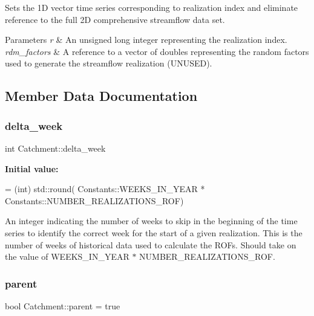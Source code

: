 Sets the 1D vector time series corresponding to realization index and eliminate reference to the full 2D comprehensive streamflow data set. 


\begin{DoxyParams}{Parameters}
{\em r} & An unsigned long integer representing the realization index. \\
\hline
{\em rdm\+\_\+factors} & A reference to a vector of doubles representing the random factors used to generate the streamflow realization (U\+N\+U\+S\+ED). \\
\hline
\end{DoxyParams}


\subsection{Member Data Documentation}
\mbox{\label{classCatchment_a20548a9d03f0d39f297cb15b3c0433ad}} 
\subsubsection{\texorpdfstring{delta\+\_\+week}{delta\_week}}
{\footnotesize\ttfamily int Catchment\+::delta\+\_\+week\hspace{0.3cm}{\ttfamily [protected]}}

{\bfseries Initial value\+:}
\begin{DoxyCode}
= (int) std::round(
            Constants::WEEKS\_IN\_YEAR * Constants::NUMBER\_REALIZATIONS\_ROF)
\end{DoxyCode}


An integer indicating the number of weeks to skip in the beginning of the time series to identify the correct week for the start of a given realization. This is the number of weeks of historical data used to calculate the R\+O\+Fs. Should take on the value of W\+E\+E\+K\+S\+\_\+\+I\+N\+\_\+\+Y\+E\+AR $\ast$ N\+U\+M\+B\+E\+R\+\_\+\+R\+E\+A\+L\+I\+Z\+A\+T\+I\+O\+N\+S\+\_\+\+R\+OF. 

\mbox{\label{classCatchment_a472ff6892f90d94b8c4dba53c462dedf}} 
\subsubsection{\texorpdfstring{parent}{parent}}
{\footnotesize\ttfamily bool Catchment\+::parent = true\hspace{0.3cm}{\ttfamily [protected]}}



